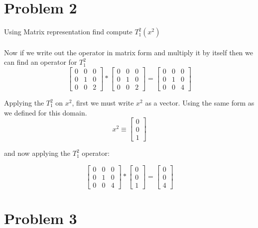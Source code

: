 \documentclass[12pt]{article}
\begin{document}
\section{Problem 2}

Using Matrix representation find compute $T_{1}^{2}(x^{2})$\\
\\
Now if we write out the operator in matrix form and multiply it by itself then we can find an operator for $T_{1}^{2}$\\

\[
\begin{bmatrix}
0 & 0 & 0\\
0 & 1 & 0\\
0 & 0 & 2
\end{bmatrix}
*
\begin{bmatrix}
0 & 0 & 0\\
0 & 1 & 0\\
0 & 0 & 2
\end{bmatrix}
=
\begin{bmatrix}
0 & 0 & 0\\
0 & 1 & 0\\
0 & 0 & 4
\end{bmatrix}
\]

Applying the $T_{1}^{2}$ on $x^{2}$, first we must write $x^{2}$ as a vector. Using the same form as we defined for this domain.\\

\[
x^{2} \equiv 
\begin{bmatrix}
0\\
0\\
1
\end{bmatrix}
\]

and now applying the $T^{2}_{1}$ operator:

\[
\begin{bmatrix}
0 & 0 & 0\\
0 & 1 & 0\\
0 & 0 & 4
\end{bmatrix}
*
\begin{bmatrix}
0\\
0\\
1
\end{bmatrix}
=
\begin{bmatrix}
0\\
0\\
4
\end{bmatrix}
\]

\section{Problem 3}
\end{document}
